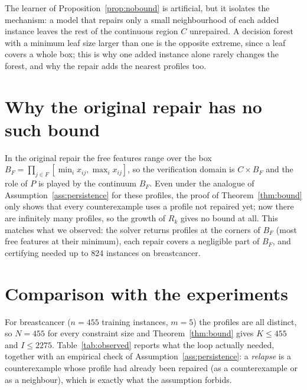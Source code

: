 \documentclass[11pt]{article}
\theoremstyle{definition}
\theoremstyle{remark}
\begin{document}
The learner of Proposition~\ref{prop:nobound} is artificial, but it isolates the mechanism:
a model that repairs only a small neighbourhood of each added instance leaves the rest of
the continuous region $C$ unrepaired.
A decision forest with a minimum leaf size larger than one is the opposite extreme, since a
leaf covers a whole box; this is why one added instance alone rarely changes the forest,
and why the repair adds the nearest profiles too.

\section{Why the original repair has no such bound}

In the original repair the free features range over the box
$B_F=\prod_{j\in F}[\min_i x_{ij},\max_i x_{ij}]$, so the verification domain is
$C\times B_F$ and the role of $P$ is played by the continuum $B_F$.
Even under the analogue of Assumption~\ref{ass:persistence} for these profiles, the proof of
Theorem~\ref{thm:bound} only shows that every counterexample uses a profile not repaired yet;
now there are infinitely many profiles, so the growth of $R_k$ gives
no bound at all.
This matches what we observed: the solver returns profiles at the corners of $B_F$ (most
free features at their minimum), each repair covers a negligible part of $B_F$, and
certifying needed up to 824 instances on breastcancer.

\section{Comparison with the experiments}\label{sec:experiments}

For breastcancer ($n=455$ training instances, $m=5$) the profiles are all distinct, so
$N=455$ for every constraint size and Theorem~\ref{thm:bound} gives $K\le 455$ and
$I\le 2275$.
Table~\ref{tab:observed} reports what the loop actually needed, together with an empirical
check of Assumption~\ref{ass:persistence}: a \emph{relapse} is a counterexample whose profile had already been repaired (as a
counterexample or as a neighbour), which is exactly what the assumption forbids.
\end{document}
